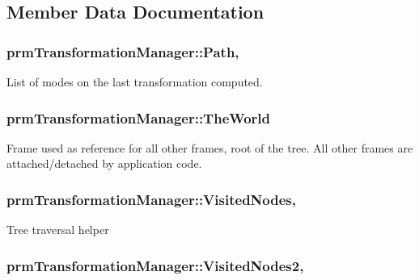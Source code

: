 \subsection{Member Data Documentation}
\hypertarget{classprm_transformation_manager_a5ca4de06a3cb7a5997b754f6f96da737}{
\subsubsection[{Path}]{ prm\-Transformation\-Manager\-::\-Path\hspace{0.3cm}{\ttfamily [static]}, {\ttfamily [protected]}}}\label{classprm_transformation_manager_a5ca4de06a3cb7a5997b754f6f96da737}
List of modes on the last transformation computed. \hypertarget{classprm_transformation_manager_a565dcc8b21bc6ffa31c62c638b540867}{
\subsubsection[{The\-World}]{ prm\-Transformation\-Manager\-::\-The\-World\hspace{0.3cm}{\ttfamily [static]}}}\label{classprm_transformation_manager_a565dcc8b21bc6ffa31c62c638b540867}
Frame used as reference for all other frames, root of the tree. All other frames are attached/detached by application code. \hypertarget{classprm_transformation_manager_a5e3fe611cb19ecfdfa5edaea3a7920b0}{
\subsubsection[{Visited\-Nodes}]{ prm\-Transformation\-Manager\-::\-Visited\-Nodes\hspace{0.3cm}{\ttfamily [static]}, {\ttfamily [protected]}}}\label{classprm_transformation_manager_a5e3fe611cb19ecfdfa5edaea3a7920b0}
Tree traversal helper \hypertarget{classprm_transformation_manager_a667e73caad0b315c6b0bde485f5fd168}{
\subsubsection[{Visited\-Nodes2}]{ prm\-Transformation\-Manager\-::\-Visited\-Nodes2\hspace{0.3cm}{\ttfamily [static]}, {\ttfamily [protected]}}}\label{classprm_transformation_manager_a667e73caad0b315c6b0bde485f5fd168}


